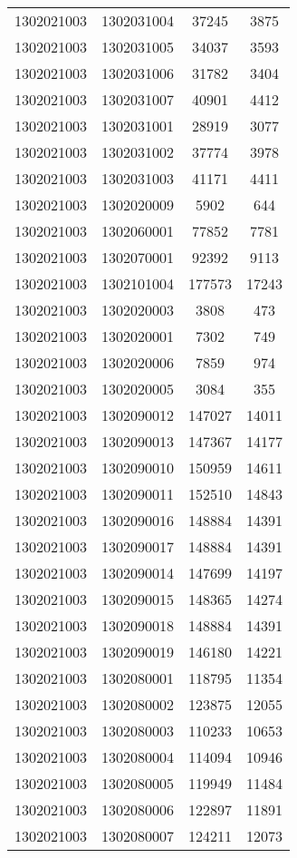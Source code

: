 \begin{longtable}{llcc}
1302021003 & 1302031004 & 37245 & 3875\\
1302021003 & 1302031005 & 34037 & 3593\\
1302021003 & 1302031006 & 31782 & 3404\\
1302021003 & 1302031007 & 40901 & 4412\\
1302021003 & 1302031001 & 28919 & 3077\\
1302021003 & 1302031002 & 37774 & 3978\\
1302021003 & 1302031003 & 41171 & 4411\\
1302021003 & 1302020009 & 5902 & 644\\
1302021003 & 1302060001 & 77852 & 7781\\
1302021003 & 1302070001 & 92392 & 9113\\
1302021003 & 1302101004 & 177573 & 17243\\
1302021003 & 1302020003 & 3808 & 473\\
1302021003 & 1302020001 & 7302 & 749\\
1302021003 & 1302020006 & 7859 & 974\\
1302021003 & 1302020005 & 3084 & 355\\
1302021003 & 1302090012 & 147027 & 14011\\
1302021003 & 1302090013 & 147367 & 14177\\
1302021003 & 1302090010 & 150959 & 14611\\
1302021003 & 1302090011 & 152510 & 14843\\
1302021003 & 1302090016 & 148884 & 14391\\
1302021003 & 1302090017 & 148884 & 14391\\
1302021003 & 1302090014 & 147699 & 14197\\
1302021003 & 1302090015 & 148365 & 14274\\
1302021003 & 1302090018 & 148884 & 14391\\
1302021003 & 1302090019 & 146180 & 14221\\
1302021003 & 1302080001 & 118795 & 11354\\
1302021003 & 1302080002 & 123875 & 12055\\
1302021003 & 1302080003 & 110233 & 10653\\
1302021003 & 1302080004 & 114094 & 10946\\
1302021003 & 1302080005 & 119949 & 11484\\
1302021003 & 1302080006 & 122897 & 11891\\
1302021003 & 1302080007 & 124211 & 12073\\

\end{longtable}
